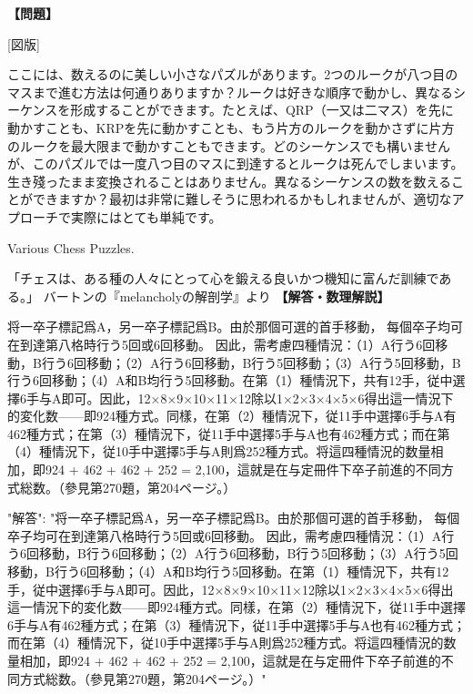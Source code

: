 \documentclass[10pt,a4paper,oneside,openany]{ltjsbook}
\begin{document}
\begin{tcolorbox}[colback=softblue,colframe=primaryblue,title=\textbf{第 345 問：THE TWO PAWNS.},arc=2mm,boxrule=1pt,breakable]
\textbf{【問題】}\par\vspace{0.3em}

[図版]

ここには、数えるのに美しい小さなパズルがあります。2つのルークが八つ目のマスまで進む方法は何通りありますか？ルークは好きな順序で動かし、異なるシーケンスを形成することができます。たとえば、QRP（一又は二マス）を先に動かすことも、KRPを先に動かすことも、もう片方のルークを動かさずに片方のルークを最大限まで動かすこともできます。どのシーケンスでも構いませんが、このパズルでは一度八つ目のマスに到達するとルークは死んでしまいます。生き殘ったまま変換されることはありません。異なるシーケンスの数を数えることができますか？最初は非常に難しそうに思われるかもしれませんが、適切なアプローチで実際にはとても単純です。

 Various Chess Puzzles.

「チェスは、ある種の人々にとって心を鍛える良いかつ機知に富んだ訓練である。」
                バートンの『melancholyの解剖学』より
\tcblower
\textbf{【解答・数理解説】}\par\vspace{0.3em}
将一卒子標記爲A，另一卒子標記爲B。由於那個可選的首手移動，
每個卒子均可在到達第八格時行う5回或6回移動。
因此，需考慮四種情況：（1）A行う6回移動，B行う6回移動；（2）A行う6回移動，B行う5回移動；（3）A行う5回移動，B行う6回移動；（4）A和B均行う5回移動。在第（1）種情況下，共有12手，従中選擇6手与A即可。因此，12×8×9×10×11×12除以1×2×3×4×5×6得出這一情況下的変化数——即924種方式。同樣，在第（2）種情況下，従11手中選擇6手与A有462種方式；在第（3）種情況下，従11手中選擇5手与A也有462種方式；而在第（4）種情況下，従10手中選擇5手与A則爲252種方式。将這四種情況的数量相加，即924 + 462 + 462 + 252 = 2,100，這就是在与定冊件下卒子前進的不同方式総数。（參見第270題，第204ページ。）

{
"解答": "将一卒子標記爲A，另一卒子標記爲B。由於那個可選的首手移動，
每個卒子均可在到達第八格時行う5回或6回移動。
因此，需考慮四種情況：（1）A行う6回移動，B行う6回移動；（2）A行う6回移動，B行う5回移動；（3）A行う5回移動，B行う6回移動；（4）A和B均行う5回移動。在第（1）種情況下，共有12手，従中選擇6手与A即可。因此，12×8×9×10×11×12除以1×2×3×4×5×6得出這一情況下的変化数——即924種方式。同樣，在第（2）種情況下，従11手中選擇6手与A有462種方式；在第（3）種情況下，従11手中選擇5手与A也有462種方式；而在第（4）種情況下，従10手中選擇5手与A則爲252種方式。将這四種情況的数量相加，即924 + 462 + 462 + 252 = 2,100，這就是在与定冊件下卒子前進的不同方式総数。（參見第270題，第204ページ。）"
}
\end{tcolorbox}
\end{document}

